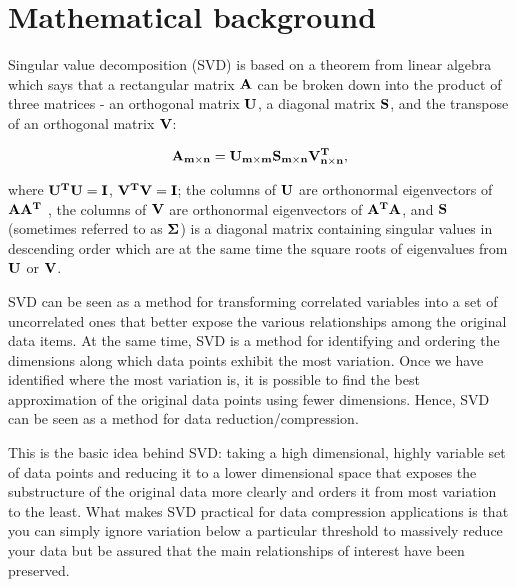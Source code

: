 \section{Mathematical background}
\label{sec:math}


Singular value decomposition (SVD) \cite{Baker2013, Kalman2002} is based on a theorem from linear algebra which says that a rectangular matrix $\mathbf{A}$ can
be broken down into the product of three matrices - an orthogonal matrix $\mathbf{U}$, a diagonal
matrix $\mathbf{S}$, and the transpose of an orthogonal matrix $\mathbf{V}$:

\begin{equation}
\mathbf{A_{m \times n}} = \mathbf{U_{m \times m}} \mathbf{S_{m \times n}} \mathbf{V^{T}_{n \times n}},
\label{eq:svd-def}
\end{equation}

where $\mathbf{U^{T}U} = \mathbf{I}$, $\mathbf{V^{T}V} = \mathbf{I}$; the columns of $\mathbf{U}$ are orthonormal eigenvectors of $\mathbf{AA^{T}}$ , the
columns of $\mathbf{V}$ are orthonormal eigenvectors of $\mathbf{A^{T}A}$, and $\mathbf{S}$ (sometimes referred to as $\mathbf{\Sigma}$) is a diagonal matrix containing singular values in descending order which are at the same time the square roots of eigenvalues from $\mathbf{U}$ or $\mathbf{V}$.

SVD can be seen as a method for transforming correlated variables into a set of uncorrelated ones that better expose the various relationships among the original data items. At the same time, SVD is a method for identifying and ordering the dimensions along which data points exhibit the most variation. Once we have identified where the most variation is, it is possible to find the best approximation of the original data points using fewer dimensions. Hence, SVD can be seen as a method for data reduction/compression.

This is the basic idea behind SVD: taking a high dimensional, highly variable set of data points and reducing it to a lower dimensional space that exposes the substructure of the original data more clearly and orders it from most variation to the least. What makes SVD practical for data compression applications is that you can simply ignore variation below a particular threshold to massively reduce your data but be assured that the main relationships of interest have been preserved.

